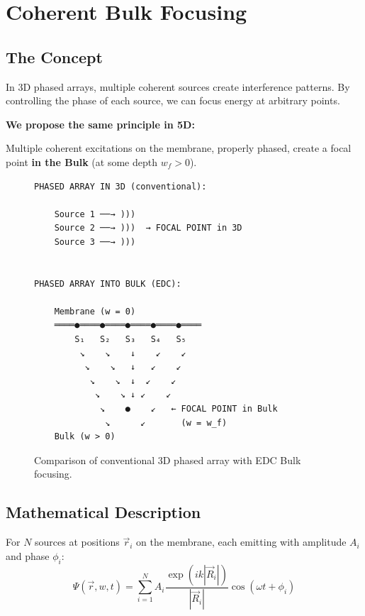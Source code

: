 \documentclass[12pt,a4paper]{article}
\begin{document}
\section{Coherent Bulk Focusing}

\subsection{The Concept}

In 3D phased arrays, multiple coherent sources create interference patterns. By controlling the phase of each source, we can focus energy at arbitrary points.

\textbf{We propose the same principle in 5D:}

Multiple coherent excitations on the membrane, properly phased, create a focal point \textbf{in the Bulk} (at some depth $w_f > 0$).

\begin{figure}[H]
\centering
\begin{verbatim}
PHASED ARRAY IN 3D (conventional):

    Source 1 ──→ )))
    Source 2 ──→ )))  → FOCAL POINT in 3D
    Source 3 ──→ )))


PHASED ARRAY INTO BULK (EDC):

    Membrane (w = 0)
    ════●════●════●════●════●════
        S₁   S₂   S₃   S₄   S₅
         ↘    ↘    ↓    ↙    ↙
          ↘    ↘   ↓   ↙    ↙
           ↘    ↘  ↓  ↙    ↙
            ↘    ↘ ↓ ↙    ↙
             ↘    ●    ↙   ← FOCAL POINT in Bulk
              ↘      ↙       (w = w_f)
    Bulk (w > 0)
\end{verbatim}
\caption{Comparison of conventional 3D phased array with EDC Bulk focusing.}
\end{figure}

\subsection{Mathematical Description}

For $N$ sources at positions $\vec{r}_i$ on the membrane, each emitting with amplitude $A_i$ and phase $\phi_i$:
\begin{equation}
\Psi(\vec{r}, w, t) = \sum_{i=1}^{N} A_i \frac{\exp(ik|\vec{R}_i|)}{|\vec{R}_i|} \cos(\omega t + \phi_i)
\end{equation}
\end{document}
